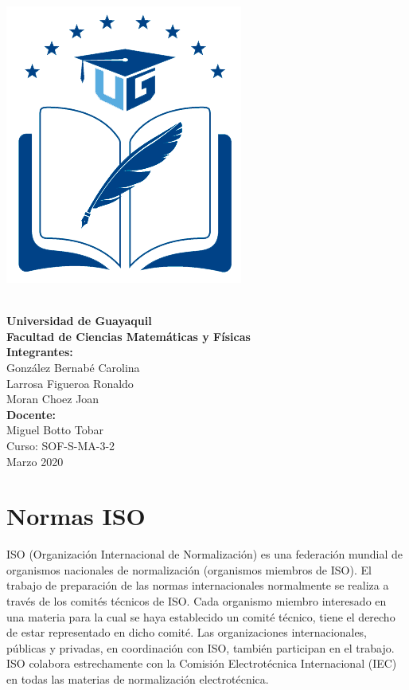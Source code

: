 \documentclass[12pt,a4paper]{article}
\begin{document}
\begin{center}
\begin{ug}
\centering
\includegraphics[scale=0.2]{UG.png}
\end{ug}\\
\textbf{Universidad de Guayaquil}\\

\textbf{Facultad de Ciencias Matemáticas y Físicas}\\

\textbf{Integrantes: }\\
González Bernabé Carolina\\      
Larrosa Figueroa Ronaldo\\
Moran Choez Joan\\
\textbf{Docente: }\\
 Miguel Botto Tobar\\
Curso: SOF-S-MA-3-2\\
Marzo 2020
\end{center} 

\newpage
\tableofcontents
\newpage

\section{Normas ISO}

ISO (Organización Internacional de Normalización) es una federación mundial de organismos nacionales de normalización (organismos miembros de ISO). El trabajo de preparación de las normas internacionales normalmente se realiza a través de los comités técnicos de ISO. Cada organismo miembro interesado en una materia para la cual se haya establecido un comité técnico, tiene el derecho de estar representado en dicho comité. Las organizaciones internacionales, públicas y privadas, en coordinación con ISO, también participan en el trabajo. ISO colabora estrechamente con la Comisión Electrotécnica Internacional (IEC) en todas las materias de normalización electrotécnica.\\
\end{document}
